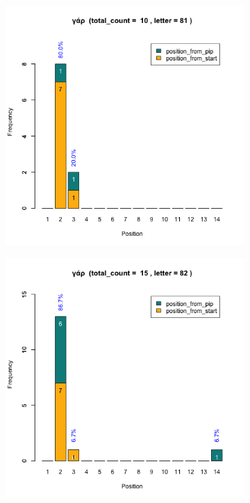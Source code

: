 \documentclass[a4paper]{article}
\begin{document}
\begin{figure}
\begin{subfigure}{0.45\textwidth}
\centering
\includegraphics[width=1\linewidth]{../../data/output/peter_R_par/plots/par1_lt81.png}
\end{subfigure}
\begin{subfigure}{0.45\textwidth}
\centering
\includegraphics[width=1\linewidth]{../../data/output/peter_R_par/plots/par1_lt82.png}
\end{subfigure}
\end{figure}
\end{document}
